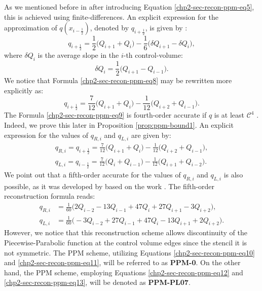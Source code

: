 As we mentioned before in after introducing Equation \eqref{chp2-sec-recon-ppm-eq5}, this is achieved
using finite-differences.
An explicit expression for the approximation of $q(x_{i-\frac{1}{2}})$, denoted by $q_{i+\frac{1}{2}}$, is given by \citep{colella:1984}:
\begin{equation}
	\label{chp2-sec-recon-ppm-eq7}
	q_{i+\frac{1}{2}} = \frac{1}{2} \bigg( Q_{i+1} + Q_{i} \bigg) - \frac{1}{6} \bigg( \delta Q_{i+1} - \delta Q_{i}\bigg),
\end{equation}
where $\delta Q_{i}$ is the average slope in the $i$-th control-volume:
\begin{equation}
	\label{chp2-sec-recon-ppm-eq8}
	\delta Q_{i} = \frac{1}{2} \bigg( Q_{i+1} - Q_{i-1} \bigg).
\end{equation}
We notice that Formula \eqref{chp2-sec-recon-ppm-eq8} may be rewritten more explicitly as:
\begin{equation}
	\label{chp2-sec-recon-ppm-eq9}
	q_{i+\frac{1}{2}} = \frac{7}{12} \bigg( Q_{i+1} + Q_{i} \bigg) - \frac{1}{12} \bigg(  Q_{i+2} +Q_{i-1}\bigg).
\end{equation}
The Formula \eqref{chp2-sec-recon-ppm-eq9} is fourth-order accurate if
$q$ is at least $\mathcal{C}^4$ \citep{colella:1984}. Indeed, we
prove this later in Proposition \ref{prop:ppm-bound1}.
An explicit expression for the values of $q_{R,i}$ and $q_{L,i}$ are given by:
\begin{align}
	\label{chp2-sec-recon-ppm-eq10}
	q_{R,i} = q_{i+\frac{1}{2}} = \frac{7}{12} \bigg( Q_{i+1} + Q_{i} \bigg) - \frac{1}{12} \bigg(  Q_{i+2} +Q_{i-1}\bigg), \\
	\label{chp2-sec-recon-ppm-eq11}
	q_{L,i} = q_{i-\frac{1}{2}} = \frac{7}{12} \bigg( Q_{i} + Q_{i-1} \bigg) - \frac{1}{12} \bigg(  Q_{i+1} +Q_{i-2}\bigg).
\end{align}
We point out that a fifth-order accurate for the values of $q_{R,i}$ and $q_{L,i}$
is also possible, as it was developed by \citet{putman:2007} 
based on the work \citet{suresh:1997}. The fifth-order reconstruction formula reads:
\begin{align}
	\label{chp2-sec-recon-ppm-eq12}
	q_{R,i} &= \frac{1}{60} \bigg( 2Q_{i-2} - 13Q_{i-1} + 47Q_{i} + 27Q_{i+1} - 3Q_{i+2}\bigg), \\
	\label{chp2-sec-recon-ppm-eq13}
	q_{L,i} &= \frac{1}{60} \bigg(-3Q_{i-2} + 27Q_{i-1} + 47Q_{i} - 13Q_{i+1} + 2Q_{i+2}\bigg).
\end{align}
However, we notice that this reconstruction scheme allows discontinuity of the 
Piecewise-Parabolic function at the control volume edges since the stencil it is not symmetric.
The PPM scheme, utilizing Equations \eqref{chp2-sec-recon-ppm-eq10} and \eqref{chp2-sec-recon-ppm-eq11},
will be referred to as \textbf{PPM-0}. On the other hand, the PPM scheme, employing Equations 
\eqref{chp2-sec-recon-ppm-eq12} and \eqref{chp2-sec-recon-ppm-eq13}, will be denoted as \textbf{PPM-PL07}.
